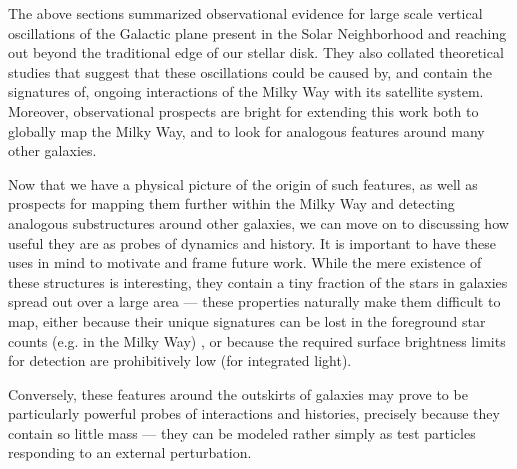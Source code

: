 \documentclass[galaxies,article,submit,moreauthors,pdftex,10pt,a4paper]{mdpi}
\begin{document}
The above sections  summarized observational evidence for large scale vertical oscillations of the Galactic plane present in the Solar Neighborhood and reaching out beyond the traditional edge of our stellar disk.
They also collated theoretical studies that suggest that these oscillations could be caused by, and contain the signatures of, ongoing interactions of the Milky Way with its satellite system.
Moreover, observational prospects are bright for extending this work both to globally map the Milky Way, and to look for analogous features around many other galaxies.

Now that we have a physical picture of the origin of such features, as well as prospects for mapping them further within the Milky Way and detecting analogous substructures around other galaxies, we can move on to discussing how useful they are as probes of dynamics and history.
It is important to have these uses in mind to motivate and frame  future work.
While the mere existence of these structures is interesting, they contain a tiny fraction of the stars in galaxies spread out over a large area --- these properties naturally make them difficult to map, either because their unique signatures can be lost in the foreground star counts (e.g. in the Milky Way) , or  because the required surface brightness limits for detection are prohibitively low (for integrated light).

Conversely, these features around the outskirts of galaxies may prove to be particularly powerful probes of interactions and histories, precisely because they contain so little mass --- they can be modeled rather simply as test particles responding to an external perturbation.
\end{document}
